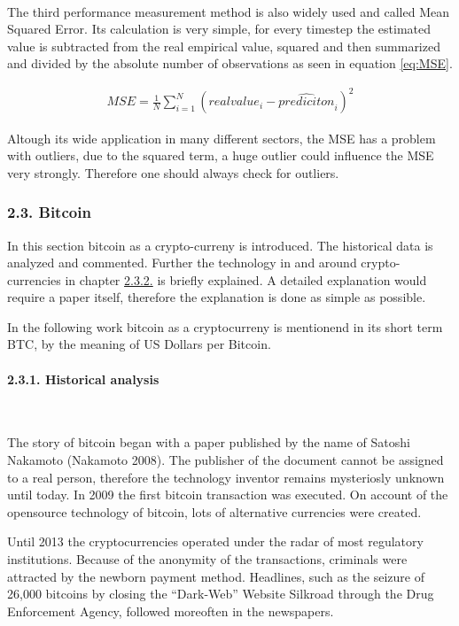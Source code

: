 \documentclass[
]{article}
\begin{document}
~

The third performance measurement method is also widely used and called
Mean Squared Error. Its calculation is very simple, for every timestep
the estimated value is subtracted from the real empirical value, squared
and then summarized and divided by the absolute number of observations
as seen in equation \ref{eq:MSE}.

\begin{align} \label{eq:MSE}
  MSE = \frac{1}{N}\sum_{i = 1}^{N}(realvalue_{i}-\hat{prediciton}_{i})^2
\end{align}  

Altough its wide application in many different sectors, the MSE has a
problem with outliers, due to the squared term, a huge outlier could
influence the MSE very strongly. Therefore one should always check for
outliers.

\newpage

\hypertarget{bitcoin}{%
\subsubsection{2.3. Bitcoin}\label{bitcoin}}

In this section bitcoin as a crypto-curreny is introduced. The
historical data is analyzed and commented. Further the technology in and
around crypto-currencies in chapter
\protect\hyperlink{bitcoin_tec}{2.3.2.} is briefly explained. A detailed
explanation would require a paper itself, therefore the explanation is
done as simple as possible.

In the following work bitcoin as a cryptocurreny is mentionend in its
short term BTC, by the meaning of US Dollars per Bitcoin.

\hypertarget{historical-analysis}{%
\paragraph{2.3.1. Historical analysis}\label{historical-analysis}}

~

The story of bitcoin began with a paper published by the name of Satoshi
Nakamoto (Nakamoto 2008). The publisher of the document cannot be
assigned to a real person, therefore the technology inventor remains
mysteriosly unknown until today. In 2009 the first bitcoin transaction
was executed. On account of the opensource technology of bitcoin, lots
of alternative currencies were created.

Until 2013 the cryptocurrencies operated under the radar of most
regulatory institutions. Because of the anonymity of the transactions,
criminals were attracted by the newborn payment method. Headlines, such
as the seizure of 26,000 bitcoins by closing the ``Dark-Web'' Website
Silkroad through the Drug Enforcement Agency, followed moreoften in the
newspapers.
\end{document}
